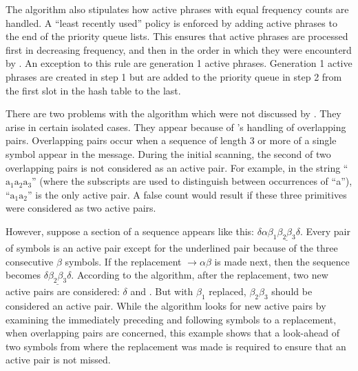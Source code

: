 The algorithm also stipulates how active phrases with equal 
frequency counts are handled.  A ``least recently used'' 
policy is enforced by adding active phrases to the end of the 
priority queue lists.  This ensures that active phrases 
are processed first in decreasing frequency, and then 
in the order in which they were encounterd by
\repair.  An exception to this rule are generation 1 active 
phrases.  Generation 1 active phrases are created in step 1 but
are added to the priority queue in step 2 from the first 
slot in the hash table to the last.  


There are two problems with the \repair algorithm which 
were not discussed by \citet{lm00:procieee}.  They
arise in certain isolated cases.  They appear because
of \repair's handling of overlapping pairs.  
Overlapping pairs occur when a sequence of length 3 or more 
of a single symbol appear in the message.  During
the initial scanning, the second of two overlapping pairs is
not considered as an active pair.  For example, in the
string ``$\text{a}_1\text{a}_2\text{a}_3$'' (where the
subscripts are used to distinguish between occurrences of 
``a''), ``$\text{a}_1\text{a}_2$'' is the only active pair.
A false count would result if these three primitives were 
considered as two active pairs.

However, suppose a section of a sequence appears like
this:  $\delta\alpha{\beta_1}\underline{{\beta_2}{\beta_3}}{\delta}$.  
Every pair of symbols is an active pair except for the underlined
pair because of the three consecutive $\beta$ symbols.  If
the replacement \tc{$\gamma$} $\rightarrow {\alpha}{\beta}$ is made
next, then the sequence becomes 
$\delta$\tc{$\gamma$}$\underline{{\beta_2}{\beta_3}}{\delta}$.
According to the algorithm, after the replacement, two new
active pairs are considered:  $\delta$\tc{$\gamma$} and .
But with ${\beta_1}$ replaced, ${\beta_2}{\beta_3}$ should be
considered an active pair.  While the algorithm looks for new
active pairs by examining the immediately preceding and following
symbols to a replacement, when overlapping pairs are concerned,
this example shows that a look-ahead of two symbols from where
the replacement was made is required to ensure that an active
pair is not missed.


